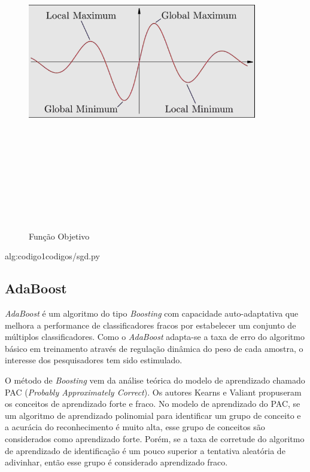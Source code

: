 \begin{figure}[ht]
    \centering
    \caption{Função Objetivo}
    \includegraphics[width=10cm,height=14cm,keepaspectratio]{figuras/funcao_objetivo.png} 
    \label{fig:internet} 
\end{figure}

 {alg:codigo1}{codigos/sgd.py}

\bigskip

\subsection{AdaBoost}

\textit{AdaBoost} é um algoritmo do tipo \textit{Boosting} \cite{wu2011some} com capacidade auto-adaptativa que melhora a performance de classificadores fracos por estabelecer um conjunto de múltiplos classificadores. Como o \textit{AdaBoost} adapta-se a taxa de erro do algoritmo básico em treinamento através de regulação dinâmica do peso de cada amostra, o interesse dos pesquisadores tem sido estimulado.

O método de \textit{Boosting} vem da análise teórica do modelo de aprendizado chamado PAC (\textit{Probably Approximately Correct}). Os autores Kearns e Valiant propuseram os conceitos de aprendizado forte e fraco. No modelo de aprendizado do PAC, se um algoritmo de aprendizado polinomial para identificar um grupo de conceito e a acurácia do reconhecimento é muito alta, esse grupo de conceitos são considerados como aprendizado forte. Porém, se a taxa de corretude do algoritmo de aprendizado de identificação é um pouco superior a tentativa aleatória de adivinhar, então esse grupo é considerado aprendizado fraco. 

